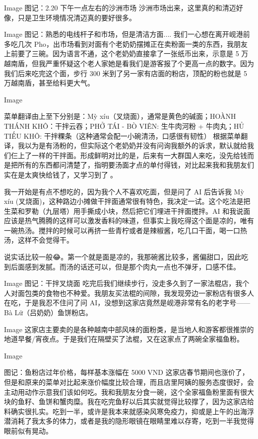 Image
图记：2.20 下午一点左右的沙洲市场
沙洲市场出来，这里真的和清迈好像，只是卫生环境情况清迈真的要好很多。

Image
图记：熟悉的电线杆子和市场，但是清洁方面....
我们一心想在离开岘港前多吃几次 Pho，出市场看到对面有个老奶奶摆摊正在卖粉面一类的东西，我朋友上前要了三碗。因为语言不通，这个老奶奶直接拿了一张纸币出来，示意是 5 万越南盾，但我严重怀疑这个老人家她是看我们是游客报了个更高一点的数字。因为我们后来吃完这个面，步行 300 米到了另一家有店面的粉店，顶配的粉也就是 5 万越南盾，甚至给料更大气。

Image

菜单翻译由上至下分别是：Mỳ xíu（叉烧面），通常是黄色的碱面；HOÀNH THÁNH KHÔ：干拌云吞；PHỞ TÁI - BÒ VIÊN: 生牛肉河粉 + 牛肉丸；HỦ TIẾU KHÔ: 干拌粿条（这种通常会配一小碗清汤，口感很有韧性）
根据菜单翻译，我以为是有汤粉的，但实际这个老奶奶并没有问询我额外的诉求，默认就给我们仨上了一样的干拌面。形成鲜明对比的是，后来有一大群国人来吃，没先给钱而是把所有的东西都问清楚了，指明要汤面才点的单付得钱，对比起来我和我朋友们实在是太爽快给钱了，又学习到了🤣。

我一开始是有点不想吃的，因为我个人不喜欢吃面，但是问了 AI 后告诉我 Mỳ xíu (叉烧面)，这种路边小摊做干拌面通常很有特色，我决定一试。这个吃法是把生菜和罗勒（九层塔）用手撕成小块，然后把它们埋进干拌面搅拌。AI 和我说面应该是热气腾腾的这样可以激发香料的味道，但事实上我吃得这个面是凉的，唯有一碗热汤。搅拌的时候可以再挤一些青柠或者是辣椒酱，吃几口干面，喝一口热汤，这样不会觉得干。

说实话比较一般😂。第一个就是面是凉的，我那碗酱比较多，酱偏甜口，因此吃到后面感到发腻。而汤的话还可以，但是那个肉丸一点也不弹牙，口感不佳。

Image
图记：干拌叉烧面
吃完后我们继续步行，没走多久到了一家法棍店，我个人对面包类的食物也不种爱。我朋友买法棍的间隙，我发现旁边一家粉店有很多人在吃，于是我忍不住问了问 AI，没想到这家店竟然是岘港非常有名的老字号——Bà Lữ（吕奶奶）鱼饼粉店。

Image
这家店主要卖的是各种越南中部风味的面粉类，是当地人和游客都很推崇的地道早餐/宵夜点。于是我们在隔壁买了法棍，又在这家点了两碗全家福鱼粉。

Image

图记：鱼粉店过年价格，每样基本涨幅在 5000 VND
这家店春节期间也涨价了，但是和原来的菜单对比起来涨价幅度比较合理，而且店里阿姨的服务态度很好，会主动用动作示意我们该如何吃。我和我朋友分食一碗，这个全家福鱼粉里面有很大块的鱼籽、鱼饼和蟹肉糜。我在吃完鱼籽以后其实就觉得比较撑了，因为这家店给料确实很扎实。吃到一半，或许是我本来就感染风寒免疫力，抑或是上午的出海浮潜消耗了我太多的体力，或者是我的隐形眼镜在眼睛里难以存寄，吃到一半我觉得眼前似有晃动。

